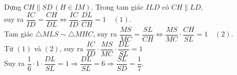\begin{ex}
{\begin{itemchoice}
    Dựng $CH \parallel SD\,(H\in IM)$.
    Trong tam giác $ ILD $ có $ CH \parallel LD $,\\ suy ra $\dfrac{IC}{ID}=\dfrac{CH}{DL}\Leftrightarrow\dfrac{IC}{ID}.\dfrac{DL}{CH}=1\quad(1)$. \\
   Tam giác $ \triangle MLS \sim \triangle  MHC$, suy ra $\dfrac{MS}{MC}=\dfrac{SL}{CH}\Leftrightarrow\dfrac{MS}{MC}\cdot \dfrac{CH}{SL}=1\quad(2)$. \\
   Từ $ (1) $ và $ (2) $, suy  ra $\dfrac{IC}{ID}\cdot \dfrac{MS}{MC}\cdot\dfrac{DL}{SL}=1$\\
   Suy  ra $\dfrac{1}{6}\cdot 1\cdot\dfrac{DL}{SL}=1\Rightarrow\dfrac{DL}{SL}=6\Rightarrow\dfrac{SL}{SD}=\dfrac{1}{7}$.
  \end{itemchoice}
 } 
\end{ex}



